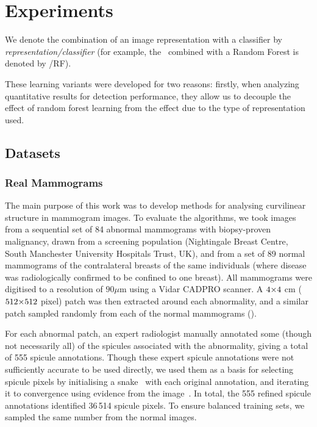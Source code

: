 \chapter{Experiments}
We denote the combination of an image representation with a classifier by \emph{representation/classifier} (for example, the \dtcwt~combined with a Random Forest is denoted by \dtcwt/RF).

These learning variants were developed for two reasons: firstly, when analyzing quantitative results for detection performance, they allow us to decouple the effect of random forest learning from the effect due to the type of representation used. 


\section{Datasets}
\subsection{Real Mammograms}
The main purpose of this work was to develop methods for analysing curvilinear structure in mammogram images. To evaluate the algorithms, we took images from a sequential set of 84 abnormal mammograms with biopsy-proven malignancy, drawn from a screening population (Nightingale Breast Centre, South Manchester University Hospitals Trust, UK), and from a set of 89 normal mammograms of the contralateral breasts of the same individuals (where disease was radiologically confirmed to be confined to one breast). All mammograms were digitised to a resolution of $90 \mu\text{m}$ using a Vidar CADPRO scanner. A $4 {\times} 4$ cm ($512 {\times} 512$ pixel) patch was then extracted around each abnormality, and a similar patch sampled randomly from each of the normal mammograms (). 

For each abnormal patch, an expert radiologist manually annotated some (though not necessarily all) of the spicules associated with the abnormality, giving a total of 555 spicule annotations. Though these expert spicule annotations were not sufficiently accurate to be used directly, we used them as a basis for selecting spicule pixels by initialising a snake~\cite{Kass_etal_IJCV88} with each original annotation, and iterating it to convergence using evidence from the image~\cite{Muralidhar_etal_TMI10}. In total, the 555 refined spicule annotations identified 36\,514 spicule pixels. To ensure balanced training sets, we sampled the same number from the normal images.


